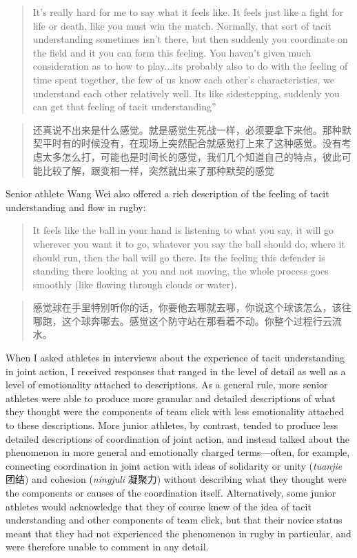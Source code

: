 \begin{CJK}{UTF8}{gbsn}
  \begin{quotation}
    It’s really hard for me to say what it feels like.  It feels just like a fight for life or death, like you must win the match.  Normally, that sort of tacit understanding sometimes isn’t there, but then suddenly you coordinate on the field and it you can form this feeling. You haven't given much consideration as to how to play...its probably also to do with the feeling of time spent together, the few of us know each other’s characteristics, we understand each other relatively well.  Its like sidestepping, suddenly you can get that feeling of tacit understanding”
  \end{quotation}

  \begin{quotation}
    还真说不出来是什么感觉。就是感觉生死战一样，必须要拿下来他。那种默契平时有的时候没有，在现场上突然配合就感觉打上来了这种感觉。没有考虑太多怎么打，可能也是时间长的感觉，我们几个知道自己的特点，彼此可能比较了解，跟变相一样，突然就出来了那种默契的感觉 
  \end{quotation}

Senior athlete Wang Wei also offered a rich description of the feeling of tacit understanding and flow in rugby:

  \begin{quotation}
    It feels like the ball in your hand is listening to what you say, it will go wherever you want it to go, whatever you say the ball should do, where it should run, then the ball will go there.  Its the feeling this defender is standing there looking at you and not moving, the whole process goes smoothly (like flowing through clouds or water).
  \end{quotation}

  \begin{quotation}
    	感觉球在手里特别听你的话，你要他去哪就去哪，你说这个球该怎么，该往哪跑，这个球奔哪去。感觉这个防守站在那看着不动。你整个过程行云流水。
  \end{quotation}


When I asked athletes in interviews about the experience of tacit understanding in joint action, I received responses that ranged in the level of detail as well as a level of emotionality attached to descriptions.  As a general rule, more senior athletes were able to produce more granular and detailed descriptions of what they thought were the components of team click with less emotionality attached to these descriptions. More junior athletes, by contrast, tended to produce less detailed descriptions of coordination of joint action, and instead talked about the phenomenon in more general and emotionally charged terms---often, for example, connecting coordination in joint action with ideas of solidarity or unity (\textit{tuanjie} 团结) and cohesion (\textit{ningjuli} 凝聚力) without describing what they thought were the components or causes of the coordination itself.  Alternatively, some junior athletes would acknowledge that they of course knew of the idea of tacit understanding and other components of team click, but that their novice status meant that they had not experienced the phenomenon in rugby in particular, and were therefore unable to comment in any detail.


\end{CJK}
